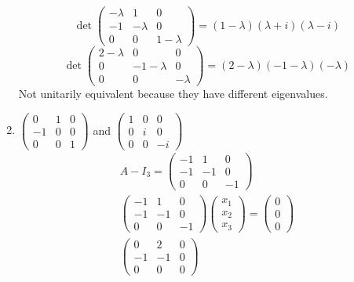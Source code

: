\begin{enumerate}
\begin{equation}
\det{
\begin{pmatrix}
-\lambda & 1 & 0\\
-1 & -\lambda & 0\\
0 & 0 & 1-\lambda
\end{pmatrix}
} = (1-\lambda)(\lambda+i)(\lambda-i)
\end{equation}
\begin{equation}
\det{
\begin{pmatrix}
2-\lambda & 0 & 0\\
0 & -1 -\lambda & 0\\
0 & 0 & -\lambda 
\end{pmatrix}
} = (2-\lambda)(-1-\lambda)(-\lambda)
\end{equation}
Not unitarily equivalent  because they have different eigenvalues.
\item $\begin{pmatrix}
0 & 1 & 0\\
-1 & 0 & 0\\
0 & 0 & 1
\end{pmatrix}$ and
$\begin{pmatrix}
1 & 0 & 0\\
0 & i & 0\\
0 & 0 & -i
\end{pmatrix}$
\begin{gather}
A -I_3 = \begin{pmatrix}
-1 & 1 & 0\\
-1 & -1 & 0\\
0 & 0 & -1
\end{pmatrix}\\
\begin{pmatrix}
-1 & 1 & 0\\
-1 & -1 & 0\\
0 & 0 & -1
\end{pmatrix}
\begin{pmatrix}
x_1\\x_2\\x_3
\end{pmatrix}
=
\begin{pmatrix}
0\\0\\0
\end{pmatrix}\\
\begin{pmatrix}
0 & 2 & 0\\
-1 & -1 & 0\\
0 & 0 & 0
\end{pmatrix}

\end{gather}
\end{enumerate}
